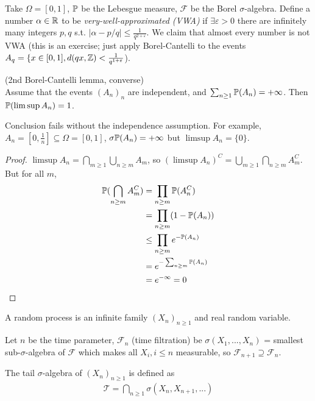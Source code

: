 \documentclass[a4paper]{article}
\begin{document}
\begin{eg}
Take $\Omega = [0,1]$, $\P$ be the Lebesgue measure, $\mathcal{F}$ be the Borel $\sigma$-algebra. Define a number $\alpha\in\R$ to be \emph{very-well-approximated (VWA)} if $\exists \varepsilon>0$ there are infinitely many integers $p,q$ s.t. $|\alpha-p/q| \leq \frac{1}{q^{2+\varepsilon}}$. We claim that almost every number is not VWA (this is an exercise; just apply Borel-Cantelli to the events $A_q =\{x \in [0,1], d(qx,\Z) < \frac{1}{q^{1+\varepsilon}}$).
\end{eg}

\begin{prop} (2nd Borel-Cantelli lemma, converse)\\
Assume that the events $(A_n)_n$ are independent, and $\sum_{n \geq 1} \P(A_n) = +\infty$. Then $\P(\limsup A_n) = 1$.
\begin{rem}
Conclusion fails without the independence assumption. For example, $A_n = [0,\frac{1}{n}] \subseteq \Omega = [0,1]$, $\sigma \P(A_n) = +\infty$ but $\limsup A_n = \{0\}$.
\end{rem}
\begin{proof}
$\limsup A_n = \bigcap_{m \geq 1} \bigcup_{n \geq m} A_m$, so $(\limsup A_n)^C = \bigcup_{m \geq 1} \bigcap_{n \geq m} A_m^C$. But for all $m$,
\begin{equation*}
\begin{aligned}
\P(\bigcap_{n \geq m} A_m^C) &= \prod_{n \geq m} \P(A_n^C)\\&=  \prod_{n \geq m} (1-\P(A_n))\\
&\leq \prod_{n \geq m} e^{-\P(A_n)}\\
&= e^{-\sum_{n\geq m} \P(A_n)}\\
&= e^{-\infty} = 0
\end{aligned}
\end{equation*}
\end{proof}
\end{prop}

\begin{defi}
A random process is an infinite family $(X_n)_{n \geq 1}$ and real random variable.
\end{defi}

Let $n$ be the time parameter, $\mathcal{F}_n$ (time filtration) be $\sigma(X_1,...,X_n)$ = smallest sub-$\sigma$-algebra of $\mathcal{F}$ which makes all $X_i,i \leq n$ measurable, so $\mathcal{F}_{n+1} \supseteq \mathcal{F}_n$.

\begin{defi}
The tail $\sigma$-algebra of $(X_n)_{n \geq 1}$ is defined as 
\begin{equation*}
\begin{aligned}
\mathcal{T} = \bigcap_{n \geq 1} \sigma(X_n,X_{n+1},...)
\end{aligned}
\end{equation*}
\end{defi}
\end{document}
